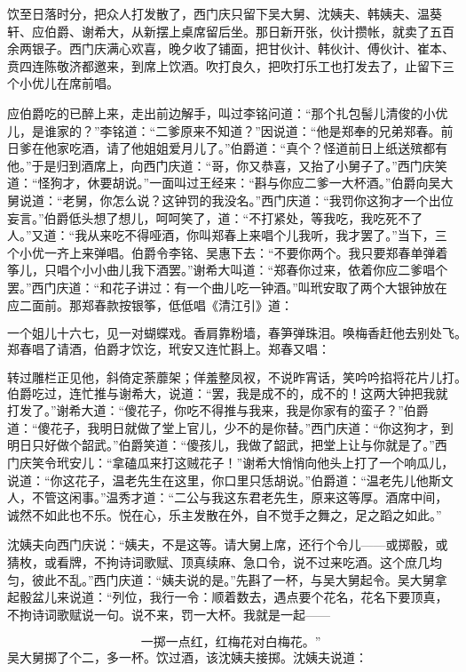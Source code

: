 饮至日落时分，把众人打发散了，西门庆只留下吴大舅、沈姨夫、韩姨夫、温葵轩、应伯爵、谢希大，从新摆上桌席留后坐。那日新开张，伙计攒帐，就卖了五百余两银子。西门庆满心欢喜，晚夕收了铺面，把甘伙计、韩伙计、傅伙计、崔本、贲四连陈敬济都邀来，到席上饮酒。吹打良久，把吹打乐工也打发去了，止留下三个小优儿在席前唱。

应伯爵吃的已醉上来，走出前边解手，叫过李铭问道：“那个扎包髻儿清俊的小优儿，是谁家的？”李铭道：“二爹原来不知道？”因说道：“他是郑奉的兄弟郑春。前日爹在他家吃酒，请了他姐姐爱月儿了。”伯爵道：“真个？怪道前日上纸送殡都有他。”于是归到酒席上，向西门庆道：“哥，你又恭喜，又抬了小舅子了。”西门庆笑道：“怪狗才，休要胡说。”一面叫过王经来：“斟与你应二爹一大杯酒。”伯爵向吴大舅说道：“老舅，你怎么说？这钟罚的我没名。”西门庆道：“我罚你这狗才一个出位妄言。”伯爵低头想了想儿，呵呵笑了，道：“不打紧处，等我吃，我吃死不了人。”又道：“我从来吃不得哑酒，你叫郑春上来唱个儿我听，我才罢了。”当下，三个小优一齐上来弹唱。伯爵令李铭、吴惠下去：“不要你两个。我只要郑春单弹着筝儿，只唱个小小曲儿我下酒罢。”谢希大叫道：“郑春你过来，依着你应二爹唱个罢。”西门庆道：“和花子讲过：有一个曲儿吃一钟酒。”叫玳安取了两个大银钟放在应二面前。那郑春款按银筝，低低唱《清江引》道：

\[
一个姐儿十六七，见一对蝴蝶戏。
香肩靠粉墙，春笋弹珠泪。
唤梅香赶他去别处飞。
\]
郑春唱了请酒，伯爵才饮讫，玳安又连忙斟上。郑春又唱：

\[
转过雕栏正见他，斜倚定荼蘼架；
佯羞整凤衩，不说昨宵话，笑吟吟掐将花片儿打。
\]
伯爵吃过，连忙推与谢希大，说道：“罢，我是成不的，成不的！这两大钟把我就打发了。”谢希大道：“傻花子，你吃不得推与我来，我是你家有的蛮子？”伯爵道：“傻花子，我明日就做了堂上官儿，少不的是你替。”西门庆道：“你这狗才，到明日只好做个韶武。”伯爵笑道：“傻孩儿，我做了韶武，把堂上让与你就是了。”西门庆笑令玳安儿：“拿磕瓜来打这贼花子！”谢希大悄悄向他头上打了一个响瓜儿，说道：“你这花子，温老先生在这里，你口里只恁胡说。”伯爵道：“温老先儿他斯文人，不管这闲事。”温秀才道：“二公与我这东君老先生，原来这等厚。酒席中间，诚然不如此也不乐。悦在心，乐主发散在外，自不觉手之舞之，足之蹈之如此。”

沈姨夫向西门庆说：“姨夫，不是这等。请大舅上席，还行个令儿——或掷骰，或猜枚，或看牌，不拘诗词歌赋、顶真续麻、急口令，说不过来吃酒。这个庶几均匀，彼此不乱。”西门庆道：“姨夫说的是。”先斟了一杯，与吴大舅起令。吴大舅拿起骰盆儿来说道：“列位，我行一令：顺着数去，遇点要个花名，花名下要顶真，不拘诗词歌赋说一句。说不来，罚一大杯。我就是一起——

\[
一掷一点红，红梅花对白梅花。”
\]
吴大舅掷了个二，多一杯。饮过酒，该沈姨夫接掷。沈姨夫说道：

